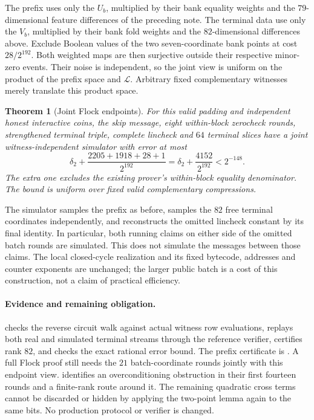\documentclass[11pt]{article}
\newtheorem{theorem}{Theorem}
\begin{document}
The prefix uses only the $U_b$, multiplied by their bank equality weights and the $79$-dimensional feature differences of the preceding note. The terminal data use only the $V_b$, multiplied by their bank fold weights and the $82$-dimensional differences above. Exclude Boolean values of the two seven-coordinate bank points at cost $28/2^{192}$. Both weighted maps are then surjective outside their respective minor-zero events. Their noise is independent, so the joint view is uniform on the product of the prefix space and $\mathcal L$. Arbitrary fixed complementary witnesses merely translate this product space.

\begin{theorem}[Joint Flock endpoints]
For this valid padding and independent honest interactive coins, the skip message, eight within-block zerocheck rounds, strengthened terminal triple, complete lincheck and $64$ terminal slices have a joint witness-independent simulator with error at most
\[
 \delta_2+\frac{2205+1918+28+1}{2^{192}}
 =\delta_2+\frac{4152}{2^{192}}<2^{-148}.
\]
The extra one excludes the existing prover's within-block equality denominator. The bound is uniform over fixed valid complementary compressions.
\end{theorem}

The simulator samples the prefix as before, samples the $82$ free terminal coordinates independently, and reconstructs the omitted lincheck constant by its final identity. In particular, both running claims on either side of the omitted batch rounds are simulated. This does not simulate the messages between those claims. The local closed-cycle realization and its fixed bytecode, addresses and counter exponents are unchanged; the larger public batch is a cost of this construction, not a claim of practical efficiency.

\paragraph{Evidence and remaining obligation.}  checks the reverse circuit walk against actual witness row evaluations, replays both real and simulated terminal streams through the reference verifier, certifies rank $82$, and checks the exact rational error bound. The prefix certificate is . A full Flock proof still needs the $21$ batch-coordinate rounds jointly with this endpoint view.  identifies an overconditioning obstruction in their first fourteen rounds and a finite-rank route around it. The remaining quadratic cross terms cannot be discarded or hidden by applying the two-point lemma again to the same bits. No production protocol or verifier is changed.
\end{document}
